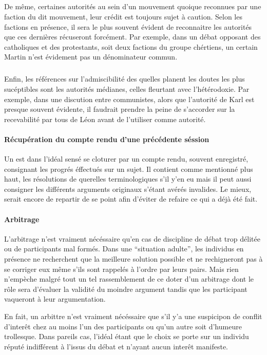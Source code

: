 \subparagraph{}
De même, certaines autorités au sein d’un mouvement quoique reconnues par une faction du dit mouvement, leur crédit est toujours sujet à caution. Selon les factions en présence, il sera le plus souvent évident de reconnaitre les autorités que ces dernières récuseront forcément. Par exemple, dans un débat opposant des catholiques et des protestants, soit deux factions du groupe chértiens, un certain Martin  n’est évidement pas un dénominateur commun.

\subparagraph{}
Enfin, les références sur l’admiscibilité des quelles planent les doutes les plus sucéptibles sont les autorités médianes, celles fleurtant avec l’hétérodoxie. Par exemple, dans une discution entre communistes, alors que l’autorité de Karl  est presque souvent évidente, il faudrait prendre la peine de s’accorder sur la recevabilité par tous de Léon  avant de l’utiliser comme autorité.

\paragraph{Récupération du compte rendu d’une précédente séssion} Un \mainabbr{} est dans l’idéal sensé se cloturer par un compte rendu, souvent enregistré, consignant les progrés éffectués sur un sujet. Il contient comme mentionné plus haut, les résolutions de querelles terminologiques s’il y’en eu mais il peut aussi consigner les différents arguments originaux s’étant avérés invalides. Le mieux, serait encore de repartir de se point afin d’éviter de refaire ce qui a déjà été fait.

\paragraph{Arbitrage} L’arbitrage n’est vraiment nécéssaire qu’en cas de discipline de débat trop délitée ou de participants mal formés. Dans une \enquote{situation adulte}, les individus en présence ne recherchent que la meilleure solution possible et ne rechigneront pas à se corriger eux même s’ils sont rappelés à l’ordre par leurs pairs. Mais rien n’empèche malgré tout un tel rassemblement de ce doter d’un arbitrage dont le rôle sera d’évaluer la validité du moindre argument tandis que les participant vaqueront à leur argumentation.

En fait, un arbittre n’est vraiment nécéssaire que s’il y’a une suspicipon de conflit d’interêt chez au moins l’un des participants ou qu’un autre soit d’humeure trollesque. Dans pareils cas, l’idéal étant que le choix se porte sur un individu réputé indifférent à l’issus du débat et n’ayant aucun interêt manifeste.

